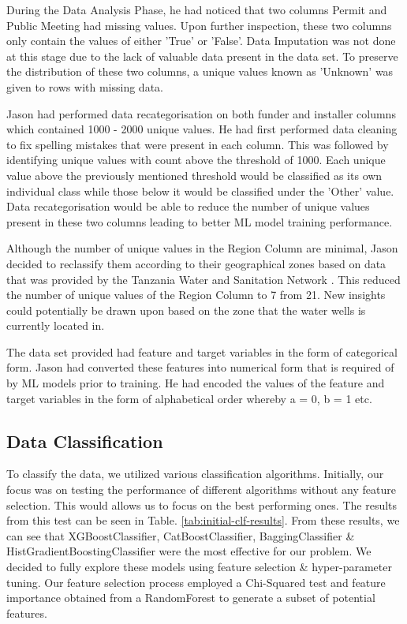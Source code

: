 \documentclass[conference]{IEEEtran}
\begin{document}
During the Data Analysis Phase, he had noticed that two columns Permit and Public Meeting had missing values. Upon further inspection, these two columns only contain the values of either 'True' or 'False'. Data Imputation was not done at this stage due to the lack of valuable data present in the data set. To preserve the distribution of these two columns, a unique values known as 'Unknown' was given to rows with missing data.

Jason had performed data recategorisation on both funder and installer columns which contained 1000 - 2000 unique values. He had first performed data cleaning to fix spelling mistakes that were present in each column. This was followed by identifying unique values with count above the threshold of 1000. Each unique value above the previously mentioned threshold would be classified as its own individual class while those below it would be classified under the 'Other' value. Data recategorisation would be able to reduce the number of unique values present in these two columns leading to better ML model training performance.

Although the number of unique values in the Region Column are minimal, Jason decided to reclassify them according to their geographical zones based on data that was provided by the Tanzania Water and Sanitation Network \cite{tawasanet}. This reduced the number of unique values of the Region Column to 7 from 21. New insights could potentially be drawn upon  based on the zone that the water wells is currently located in.

The data set provided had feature and target variables in the form of categorical form. Jason had converted these features into numerical form that is required of by ML models prior to training. He had encoded the values of the feature and target variables in the form of alphabetical order whereby a = 0, b = 1 etc. 

\subsection{Data Classification}

 To classify the data, we utilized various classification algorithms. Initially, our focus was on testing the performance of different algorithms without any feature selection. This would allows us to focus on the best performing ones. The results from this test can be seen in Table. \ref{tab:initial-clf-results}. From these results, we can see that XGBoostClassifier, CatBoostClassifier, BaggingClassifier \& HistGradientBoostingClassifier were the most effective for our problem. We decided to fully explore these models using feature selection \& hyper-parameter tuning. Our feature selection process employed a Chi-Squared test and feature importance obtained from a RandomForest to generate a subset of potential features.
\end{document}
